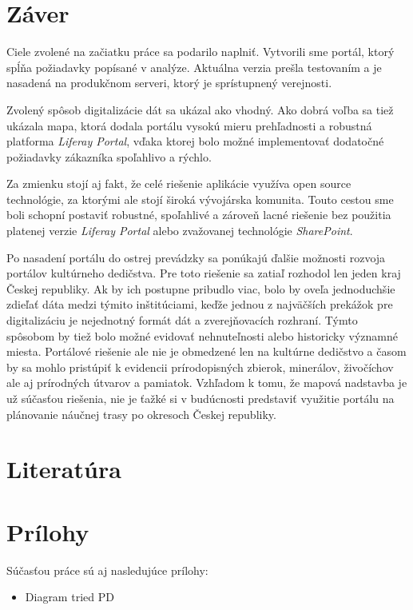 \documentclass[
  print, %
  table,   %
  lof,     %
  nolot,     %
]{fithesis3}
\begin{document}
\chapter{Záver}
Ciele zvolené na začiatku práce sa podarilo naplniť. Vytvorili sme portál, ktorý spĺňa požiadavky popísané v analýze. Aktuálna verzia prešla testovaním a je nasadená na produkčnom serveri, ktorý je sprístupnený verejnosti.

Zvolený spôsob digitalizácie dát sa ukázal ako vhodný. Ako dobrá voľba sa tiež ukázala mapa, ktorá dodala portálu vysokú mieru prehľadnosti a robustná platforma \textit{Liferay Portal}, vďaka ktorej bolo možné implementovať dodatočné požiadavky zákazníka spoľahlivo a rýchlo.

Za zmienku stojí aj fakt, že celé riešenie aplikácie využíva open source technológie, za ktorými ale stojí široká vývojárska komunita. Touto cestou sme boli schopní postaviť robustné, spoľahlivé a zároveň lacné riešenie bez použitia platenej verzie \textit{Liferay Portal} alebo zvažovanej technológie \textit{SharePoint}.

Po nasadení portálu do ostrej prevádzky sa ponúkajú ďalšie možnosti rozvoja portálov kultúrneho dedičstva. Pre toto riešenie sa zatiaľ rozhodol len jeden kraj Českej republiky. Ak by ich postupne pribudlo viac, bolo by oveľa jednoduchšie zdieľať dáta medzi týmito inštitúciami, keďže jednou z najväčších prekážok pre digitalizáciu je nejednotný formát dát a zverejňovacích rozhraní. Týmto spôsobom by tiež bolo možné evidovať nehnuteľnosti alebo historicky významné miesta. Portálové riešenie ale nie je obmedzené len na kultúrne dedičstvo a časom by sa mohlo pristúpiť k evidencii prírodopisných zbierok, minerálov, živočíchov ale aj prírodných útvarov a pamiatok. Vzhľadom k tomu, že mapová nadstavba je už súčasťou riešenia, nie je ťažké si v budúcnosti predstaviť využitie portálu na plánovanie náučnej trasy po okresoch Českej republiky.  
\chapter*{Literatúra}
\printbibliography[heading=none] %
\chapter*{Prílohy}
Súčasťou práce sú aj nasledujúce prílohy:
\begin{itemize}
	\item Diagram tried PD
\end{itemize}
\end{document}
